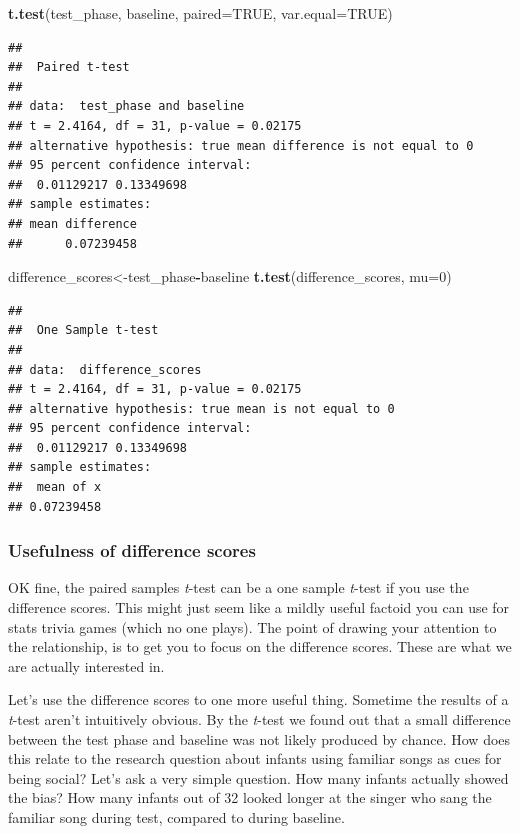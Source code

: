 \documentclass[
]{book}
\newenvironment{Shaded}{\begin{snugshade}}{\end{snugshade}}
\newcommand{\AttributeTok}[1]{\textcolor[rgb]{0.13,0.29,0.53}{#1}}
\newcommand{\ConstantTok}[1]{\textcolor[rgb]{0.56,0.35,0.01}{#1}}
\newcommand{\DecValTok}[1]{\textcolor[rgb]{0.00,0.00,0.81}{#1}}
\newcommand{\FunctionTok}[1]{\textcolor[rgb]{0.13,0.29,0.53}{\textbf{#1}}}
\newcommand{\NormalTok}[1]{#1}
\newcommand{\OtherTok}[1]{\textcolor[rgb]{0.56,0.35,0.01}{#1}}
\newcommand{\SpecialCharTok}[1]{\textcolor[rgb]{0.81,0.36,0.00}{\textbf{#1}}}
\begin{document}
\begin{Shaded}
\begin{Highlighting}[]
\FunctionTok{t.test}\NormalTok{(test\_phase, baseline, }\AttributeTok{paired=}\ConstantTok{TRUE}\NormalTok{, }\AttributeTok{var.equal=}\ConstantTok{TRUE}\NormalTok{)}
\end{Highlighting}
\end{Shaded}

\begin{verbatim}
## 
##  Paired t-test
## 
## data:  test_phase and baseline
## t = 2.4164, df = 31, p-value = 0.02175
## alternative hypothesis: true mean difference is not equal to 0
## 95 percent confidence interval:
##  0.01129217 0.13349698
## sample estimates:
## mean difference 
##      0.07239458
\end{verbatim}

\begin{Shaded}
\begin{Highlighting}[]
\NormalTok{difference\_scores}\OtherTok{\textless{}{-}}\NormalTok{test\_phase}\SpecialCharTok{{-}}\NormalTok{baseline}
\FunctionTok{t.test}\NormalTok{(difference\_scores, }\AttributeTok{mu=}\DecValTok{0}\NormalTok{)}
\end{Highlighting}
\end{Shaded}

\begin{verbatim}
## 
##  One Sample t-test
## 
## data:  difference_scores
## t = 2.4164, df = 31, p-value = 0.02175
## alternative hypothesis: true mean is not equal to 0
## 95 percent confidence interval:
##  0.01129217 0.13349698
## sample estimates:
##  mean of x 
## 0.07239458
\end{verbatim}

\hypertarget{usefulness-of-difference-scores}{%
\subsubsection{Usefulness of difference scores}\label{usefulness-of-difference-scores}}

OK fine, the paired samples \emph{t}-test can be a one sample \emph{t}-test if you use the difference scores. This might just seem like a mildly useful factoid you can use for stats trivia games (which no one plays). The point of drawing your attention to the relationship, is to get you to focus on the difference scores. These are what we are actually interested in.

Let's use the difference scores to one more useful thing. Sometime the results of a \emph{t}-test aren't intuitively obvious. By the \emph{t}-test we found out that a small difference between the test phase and baseline was not likely produced by chance. How does this relate to the research question about infants using familiar songs as cues for being social? Let's ask a very simple question. How many infants actually showed the bias? How many infants out of 32 looked longer at the singer who sang the familiar song during test, compared to during baseline.
\end{document}
